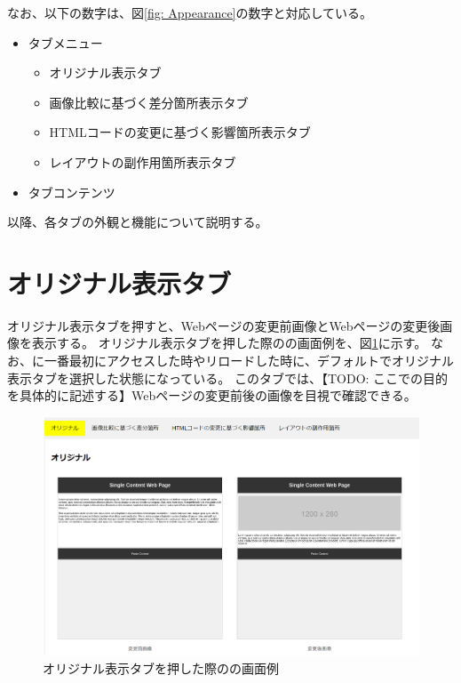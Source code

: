 なお、以下の数字は、図\ref{fig: Appearance}の数字と対応している。
\begin{itemize}
    \item[①] タブメニュー
          \begin{itemize}
              \item オリジナル表示タブ
              \item 画像比較に基づく差分箇所表示タブ
              \item HTMLコードの変更に基づく影響箇所表示タブ
              \item レイアウトの副作用箇所表示タブ
          \end{itemize}
    \item[②] タブコンテンツ
\end{itemize}
\par
以降、各タブの外観と機能について説明する。



\section{オリジナル表示タブ}\label{subsec:original_tab}
オリジナル表示タブを押すと、Webページの変更前画像とWebページの変更後画像を表示する。
オリジナル表示タブを押した際の\toolName の画面例を、図\ref{fig: Appearance_original_tab}に示す。
なお、\toolName に一番最初にアクセスした時やリロードした時に、デフォルトでオリジナル表示タブを選択した状態になっている。
このタブでは、【TODO: ここでの目的を具体的に記述する】Webページの変更前後の画像を目視で確認できる。
\begin{figure}[tp]
    \begin{center}
        \includegraphics[width=1.0\columnwidth]{image/3_original_tab.png}
        \caption{オリジナル表示タブを押した際の\toolName の画面例}
        \label{fig: Appearance_original_tab}
    \end{center}
\end{figure}



